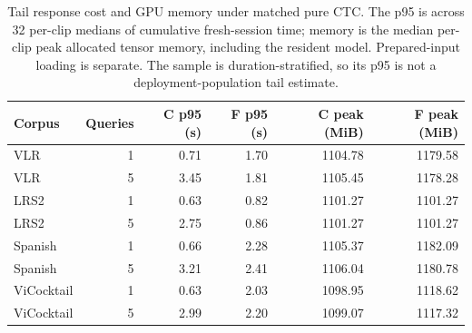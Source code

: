 \begin{table}[tb]
\centering\small
\caption{Tail response cost and GPU memory under matched pure CTC. The p95 is across 32 per-clip medians of cumulative fresh-session time; memory is the median per-clip peak allocated tensor memory, including the resident model. Prepared-input loading is separate. The sample is duration-stratified, so its p95 is not a deployment-population tail estimate.}
\label{tab:matched-query-resources}
\begin{tabular}{lrrrrr}
\toprule
Corpus & Queries & C p95 (s) & F p95 (s) & C peak (MiB) & F peak (MiB) \\
\midrule
VLR & 1 & 0.71 & 1.70 & 1104.78 & 1179.58 \\
VLR & 5 & 3.45 & 1.81 & 1105.45 & 1178.28 \\
LRS2 & 1 & 0.63 & 0.82 & 1101.27 & 1101.27 \\
LRS2 & 5 & 2.75 & 0.86 & 1101.27 & 1101.27 \\
Spanish & 1 & 0.66 & 2.28 & 1105.37 & 1182.09 \\
Spanish & 5 & 3.21 & 2.41 & 1106.04 & 1180.78 \\
ViCocktail & 1 & 0.63 & 2.03 & 1098.95 & 1118.62 \\
ViCocktail & 5 & 2.99 & 2.20 & 1099.07 & 1117.32 \\
\bottomrule
\end{tabular}
\end{table}
